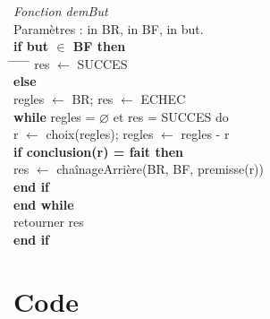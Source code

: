 \documentclass {report}
\begin{document}
\begin{tabbing}
\textit{Fonction demBut}\\
Paramètres : in BR, in BF, in but.\\
\textbf{if but $\in$ BF then}\\
\hspace{0.5cm} \= \hspace{0.5cm} \= \hspace{0.5cm} \= \hspace{0.5cm} \= \hspace{0.5cm} \= \kill
\> res $\leftarrow$ SUCCES\\
\textbf{else}\\
\> regles $\leftarrow$ BR; res $\leftarrow$ ECHEC\\
\> \textbf{while} regles = $\varnothing$ et res = SUCCES do\\
\> \> r $\leftarrow$ choix(regles); regles $\leftarrow$ regles - {r}\\
\> \> \textbf{if conclusion(r) = fait then}\\
\> \> \> res $\leftarrow$ chaînageArrière(BR, BF, premisse(r))\\
\> \> \textbf{end if}\\
\> \textbf{end while}\\
\> retourner res\\
\textbf{end if}\\
\end{tabbing}
\paragraph{}

\chapter{Code}
\end{document}
